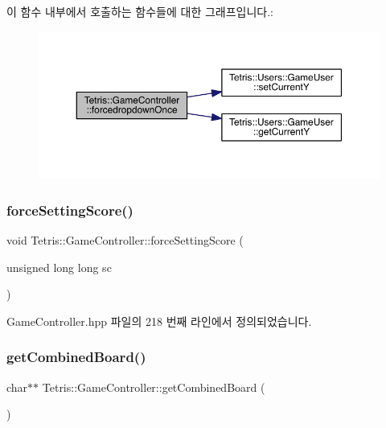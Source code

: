 이 함수 내부에서 호출하는 함수들에 대한 그래프입니다.\+:
\nopagebreak
\begin{figure}[H]
\begin{center}
\leavevmode
\includegraphics[width=350pt]{class_tetris_1_1_game_controller_a035e352a85db58a05322156af606f0fa_cgraph}
\end{center}
\end{figure}
\mbox{\label{class_tetris_1_1_game_controller_ab0fafbfd1d87713f4f9233ccc547ffb8}} 
\subsubsection{\texorpdfstring{force\+Setting\+Score()}{forceSettingScore()}}
{\footnotesize\ttfamily void Tetris\+::\+Game\+Controller\+::force\+Setting\+Score (\begin{DoxyParamCaption}\item[{unsigned long long}]{sc }\end{DoxyParamCaption})\hspace{0.3cm}{\ttfamily [inline]}}



Game\+Controller.\+hpp 파일의 218 번째 라인에서 정의되었습니다.

\mbox{\label{class_tetris_1_1_game_controller_a6c22f25017881f6150428b62e4607310}} 
\subsubsection{\texorpdfstring{get\+Combined\+Board()}{getCombinedBoard()}}
{\footnotesize\ttfamily char$\ast$$\ast$ Tetris\+::\+Game\+Controller\+::get\+Combined\+Board (\begin{DoxyParamCaption}{ }\end{DoxyParamCaption})\hspace{0.3cm}{\ttfamily [inline]}}

